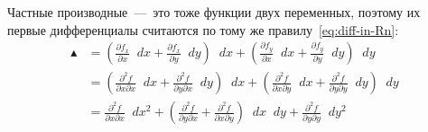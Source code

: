 \documentclass[a4paper,12pt]{article}
\newcommand{\diff}{\mathop{}\!d}
\begin{document}
  Частные производные~---~это тоже функции двух переменных, поэтому их первые дифференциалы считаются по тому же правилу~\eqref{eq:diff-in-Rn}:
  \begin{equation*}
  \begin{split}
    \blacktriangle &= \left(\frac{\partial f_x}{\partial x} \diff x + \frac{\partial f_x}{\partial y} \diff y\right) \diff x + \left(\frac{\partial f_y}{\partial x} \diff x + \frac{\partial f_y}{\partial y} \diff y\right) \diff y\\
    &= \left(\frac{\partial^2 f}{\partial x \partial x} \diff x + \frac{\partial^2 f}{\partial y \partial x} \diff y\right) \diff x + \left(\frac{\partial^2 f}{\partial x \partial y} \diff x + \frac{\partial^2 f}{\partial y \partial y} \diff y\right) \diff y\\
    &= \frac{\partial^2 f}{\partial x \partial x} \diff x^2
    + \left(\frac{\partial^2 f}{\partial y \partial x} + \frac{\partial^2 f}{\partial x \partial y}\right) \diff x \diff y + \frac{\partial^2 f}{\partial y \partial y} \diff y^2
  \end{split}
  \end{equation*}
\end{document}
